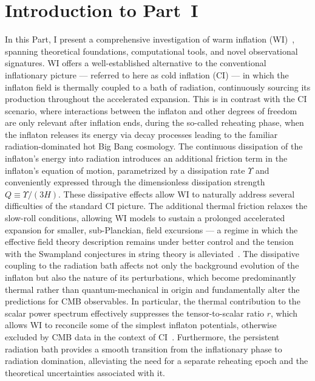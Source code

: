\chapter*{Introduction to Part~I}
\label{ch:part1-intro}

In this Part, I present a comprehensive investigation of warm inflation (WI)~\cite{Berera:1995ie}, spanning theoretical foundations, computational tools, and novel observational signatures. WI offers a well-established alternative to the conventional inflationary picture --- referred to here as cold inflation (CI) --- in which the inflaton field is thermally coupled to a bath of radiation, continuously sourcing its production throughout the accelerated expansion. This is in contrast with the CI scenario, where interactions between the inflaton and other degrees of freedom are only relevant after inflation ends, during the so-called reheating phase, when the inflaton releases its energy via decay processes leading to the familiar radiation-dominated hot Big Bang cosmology. The continuous dissipation of the inflaton's energy into radiation introduces an additional friction term in the inflaton's equation of motion, parametrized by a dissipation rate $\Upsilon$ and conveniently expressed through the dimensionless dissipation strength $Q \equiv \Upsilon/(3H)$. These dissipative effects allow WI to naturally address several difficulties of the standard CI picture. The additional thermal friction relaxes the slow-roll conditions, allowing WI models to sustain a prolonged accelerated expansion for smaller, sub-Planckian, field excursions --- a regime in which the effective field theory description remains under better control and the tension with the Swampland conjectures in string theory is alleviated~\cite{Das:2018hqy,Motaharfar:2018zyb,Brandenberger:2020oav}. The dissipative coupling to the radiation bath affects not only the background evolution of the inflaton but also the nature of its perturbations,  which become predominantly thermal rather than quantum-mechanical in origin and fundamentally alter the predictions for CMB observables. In particular, the thermal contribution to the scalar power spectrum effectively suppresses the tensor-to-scalar ratio $r$, which allows WI to reconcile some of the simplest inflaton potentials, otherwise excluded by CMB data in the context of CI~\cite{Planck:2018jri,BICEP:2021xfz,Benetti:2016jhf}. Furthermore, the persistent radiation bath provides a smooth transition from the inflationary phase to radiation domination, alleviating the need for a separate reheating epoch and the theoretical uncertainties associated with it.

